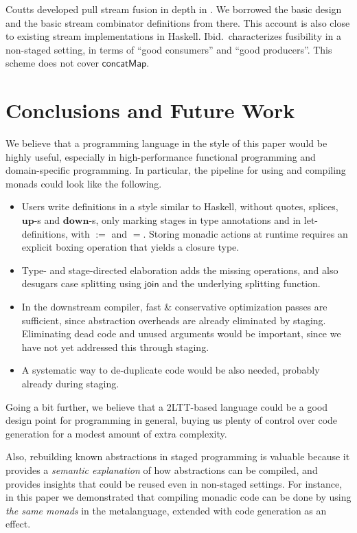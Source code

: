 \documentclass[acmsmall,screen,review,anonymous]{acmart}
\newcommand{\mit}[1]{{\mathsf{#1}}}
\newcommand{\msf}[1]{{\mathsf{#1}}}
\newcommand{\mbf}[1]{{\mathbf{#1}}}
\newcommand{\concatMap}{\msf{concatMap}}
\theoremstyle{remark}
\newcommand{\mup}{\mbf{up}}
\newcommand{\mdown}{\mbf{down}}
\newcommand{\join}{\mit{join}}
\begin{document}
Coutts developed pull stream fusion in depth in
\cite{DBLP:phd/ethos/Coutts11}. We borrowed the basic design and the basic
stream combinator definitions from there. This account is also close to existing
stream implementations in Haskell. Ibid.\ characterizes fusibility in a
non-staged setting, in terms of ``good consumers'' and ``good producers''.  This
scheme does not cover $\concatMap$.

\section{Conclusions and Future Work}

We believe that a programming language in the style of this paper would be
highly useful, especially in high-performance functional programming and
domain-specific programming. In particular, the pipeline for using and compiling
monads could look like the following.
\begin{itemize}
\item Users write definitions in a style similar to Haskell, without quotes,
      splices, $\mup$-s and $\mdown$-s, only marking stages in type annotations and
      in let-definitions, with $:=$ and $=$.  Storing monadic actions at runtime
      requires an explicit boxing operation that yields a closure type.
\item Type- and stage-directed elaboration adds the missing operations, and also desugars
      case splitting using $\join$ and the underlying splitting function.
\item In the downstream compiler, fast \& conservative optimization passes are
      sufficient, since abstraction overheads are already eliminated by staging. Eliminating
      dead code and unused arguments would be important, since we have not yet addressed
      this through staging.
\item A systematic way to de-duplicate code would be also needed, probably already
      during staging.
\end{itemize}

Going a bit further, we believe that a 2LTT-based language could be a good design point
for programming in general, buying us plenty of control over code generation for
a modest amount of extra complexity.

Also, rebuilding known abstractions in staged programming is valuable because it
provides a \emph{semantic explanation} of how abstractions can be compiled, and
provides insights that could be reused even in non-staged settings. For
instance, in this paper we demonstrated that compiling monadic code can be done
by using \emph{the same monads} in the metalanguage, extended with code
generation as an effect.
\end{document}

